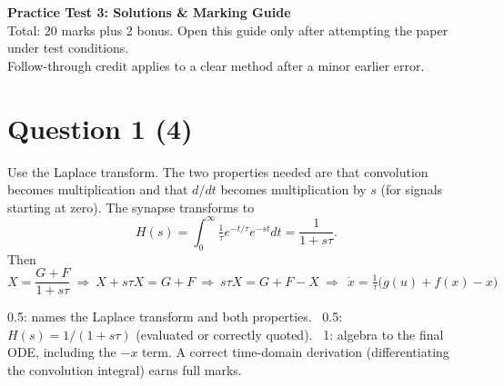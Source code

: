 \documentclass[11pt,letterpaper]{article}
\newcommand{\ans}[1]{\par\vspace{4pt}{\bfseries #1}\quad}
\begin{document}
\begin{center}
{\Large\bfseries Practice Test 3: Solutions \& Marking Guide}\\[2pt]
Total: 20 marks plus 2 bonus. Open this guide only after attempting the paper under test conditions.\\
Follow-through credit applies to a clear method after a minor earlier error.
\end{center}

\section*{Question 1 \hfill (4)}

\ans{(a) [2]}
Use the Laplace transform. The two properties needed are that convolution becomes multiplication and that $d/dt$ becomes multiplication by $s$ (for signals starting at zero). The synapse transforms to
\[
H(s) = \int_0^\infty \tfrac1\tau e^{-t/\tau}e^{-st}dt = \frac{1}{1 + s\tau}.
\]
Then
\[
X = \frac{G + F}{1 + s\tau} \ \Rightarrow\ X + s\tau X = G + F \ \Rightarrow\ s\tau X = G + F - X \ \Rightarrow\ \boxed{\ \dot x = \tfrac1\tau\bigl(g(u) + f(x) - x\bigr)\ }
\]
\begin{marking}
0.5: names the Laplace transform and both properties. \ 0.5: $H(s) = 1/(1 + s\tau)$ (evaluated or correctly quoted). \ 1: algebra to the final ODE, including the $-x$ term. A correct time-domain derivation (differentiating the convolution integral) earns full marks.
\end{marking}
\end{document}
